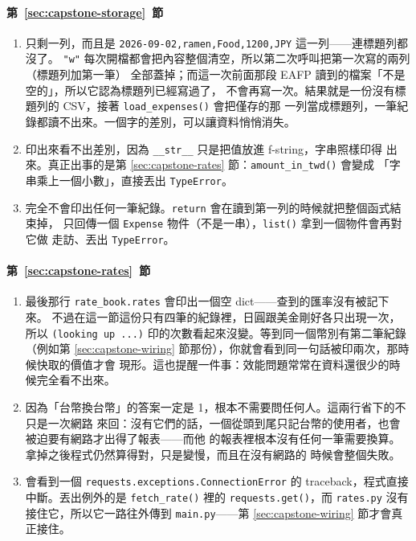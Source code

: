\paragraph{第~\ref{sec:capstone-storage}~節}
\begin{enumerate}
\item 只剩一列，而且是 \texttt{2026-09-02,ramen,Food,1200,JPY} 這一列——連標題列都沒了。
\texttt{"w"} 每次開檔都會把內容整個清空，所以第二次呼叫把第一次寫的兩列（標題列加第一筆）
全部蓋掉；而這一次前面那段 EAFP 讀到的檔案「不是空的」，所以它認為標題列已經寫過了，
不會再寫一次。結果就是一份沒有標題列的 CSV，接著 \texttt{load\_expenses()} 會把僅存的那
一列當成標題列，一筆紀錄都讀不出來。一個字的差別，可以讓資料悄悄消失。
\item 印出來看不出差別，因為 \texttt{\_\_str\_\_} 只是把值放進 f-string，字串照樣印得
出來。真正出事的是第 \ref{sec:capstone-rates} 節：\texttt{amount\_in\_twd()} 會變成
「字串乘上一個小數」，直接丟出 \texttt{TypeError}。
\item 完全不會印出任何一筆紀錄。\texttt{return} 會在讀到第一列的時候就把整個函式結束掉，
只回傳一個 \texttt{Expense} 物件（不是一串），\texttt{list()} 拿到一個物件會再對它做
走訪、丟出 \texttt{TypeError}。
\end{enumerate}

\paragraph{第~\ref{sec:capstone-rates}~節}
\begin{enumerate}
\item 最後那行 \texttt{rate\_book.rates} 會印出一個空 dict——查到的匯率沒有被記下來。
不過在這一節這份只有四筆的紀錄裡，日圓跟美金剛好各只出現一次，所以
\texttt{(looking up ...)} 印的次數看起來沒變。等到同一個幣別有第二筆紀錄（例如第
\ref{sec:capstone-wiring} 節那份），你就會看到同一句話被印兩次，那時候快取的價值才會
現形。這也提醒一件事：效能問題常常在資料還很少的時候完全看不出來。
\item 因為「台幣換台幣」的答案一定是 1，根本不需要問任何人。這兩行省下的不只是一次網路
來回：沒有它們的話，一個從頭到尾只記台幣的使用者，也會被迫要有網路才出得了報表——而他
的報表裡根本沒有任何一筆需要換算。拿掉之後程式仍然算得對，只是變慢，而且在沒有網路的
時候會整個失敗。
\item 會看到一個 \texttt{requests.exceptions.ConnectionError} 的 traceback，程式直接
中斷。丟出例外的是 \texttt{fetch\_rate()} 裡的 \texttt{requests.get()}，而
\texttt{rates.py} 沒有接住它，所以它一路往外傳到 \texttt{main.py}——第
\ref{sec:capstone-wiring} 節才會真正接住。
\end{enumerate}

